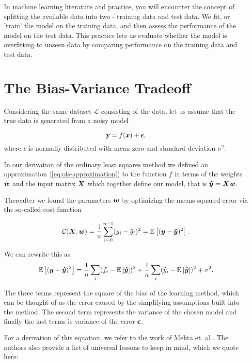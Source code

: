 In machine learning literature and practice, you will encounter the concept of
splitting the available data into two - training data and test data. We fit, or 'train'
the model on the training data, and then assess the performance of the model on the 
test data. This practice lets us evaluate whether the model is overfitting to unseen
data by comparing performance on the training data and test data.

\section{The Bias-Variance Tradeoff}\label{sec:bias-variance}
Considering the same dataset $\mathcal{L}$ consisting of the data,
let us assume that the true data is generated from a noisy model

$$\mathbf{y}=f({\boldsymbol{x}}) + {\boldsymbol{\epsilon}},$$
where $\epsilon$ is normally distributed with mean zero and standard deviation $\sigma^2$.

In our derivation of the ordinary least squares method we defined
an approximation (\ref{eq:ols-approximation}) to the function $f$ in terms of the 
weights ${\boldsymbol{w}}$ and the input matrix ${\boldsymbol{X}}$ which together define our model,
that is ${\boldsymbol{\hat{y}}}={\boldsymbol{X}}{\boldsymbol{w}}$. 

Thereafter we found the parameters ${\boldsymbol{w}}$ by optimizing the means squared error via the so-called cost function

$$\mathcal{C}({\boldsymbol{X}},{\boldsymbol{w}}) =\frac{1}{n}\sum_{i=0}^{n-1}(y_i-\hat{y}_i)^2=\mathbb{E}\left[({\boldsymbol{y}}-{\boldsymbol{\hat{y}}})^2\right].$$

We can rewrite this as 
$$\mathbb{E}\left[({\boldsymbol{y}}-{\boldsymbol{\hat{y}}})^2\right]=\frac{1}{n}\sum_i(f_i-\mathbb{E}\left[{\boldsymbol{\hat{y}}}\right])^2+\frac{1}{n}\sum_i(\hat{y}_i-\mathbb{E}\left[{\boldsymbol{\hat{y}}}\right])^2+\sigma^2.$$

The three terms represent the square of the bias of the learning
method, which can be thought of as the error caused by the simplifying
assumptions built into the method. The second term represents the
variance of the chosen model and finally the last terms is variance of
the error ${\boldsymbol{\epsilon}}$.

For a derivation of this equation, we refer to the work of Mehta et. al \cite{Mehta2019}.
The authors also provide a list of universal lessons to keep in mind, which we quote here:

